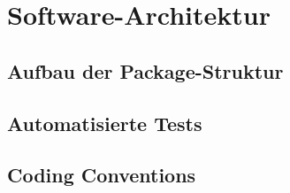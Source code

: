 \chapter{Software-Architektur}
\label{ch:software-architektur}

\section{Aufbau der Package-Struktur}
\label{sec:package-struktur}

\section{Automatisierte Tests}
\label{sec:tests}

\section{Coding Conventions}
\label{sec:code-conventions}